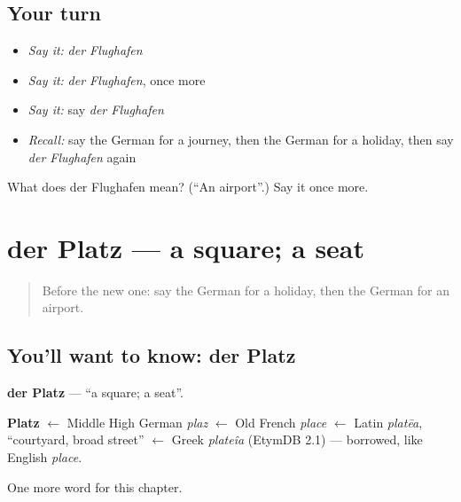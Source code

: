 \subsection*{Your turn}
\begin{itemize}
\raggedright
  \item \emph{Say it:} \emph{der Flughafen}
  \item \emph{Say it:} \emph{der Flughafen}, once more
  \item \emph{Say it:} say \emph{der Flughafen}
  \item \emph{Recall:} say the German for a journey, then the German for a holiday, then say \emph{der Flughafen} again
\end{itemize}

\begin{tcolorbox}[breakable,colback=teal!4,colframe=teal!35!black,title={Before you move on}]
What does der Flughafen mean? (\textquotedblleft{}An airport\textquotedblright{}.) Say it once more.
\end{tcolorbox}
\section[der Platz]{der Platz — a square; a seat}

\label{lesson:GE-C104-platz}



\begin{quote}
Before the new one: say the German for a holiday, then the German for an airport.
\end{quote}

\subsection*{You'll want to know: der Platz}
\textbf{der Platz} — \textquotedblleft{}a square; a seat\textquotedblright{}.

\begin{cousinweb}
\textbf{Platz} $\leftarrow$ Middle High German \emph{plaz} $\leftarrow$ Old French \emph{place} $\leftarrow$ Latin \emph{platēa}, \textquotedblleft{}courtyard, broad street\textquotedblright{} $\leftarrow$ Greek \emph{plateîa} (EtymDB 2.1) — borrowed, like English \emph{place}.
\end{cousinweb}

\begin{grammarlens}[title={What you've built}]
One more word for this chapter.
\end{grammarlens}

